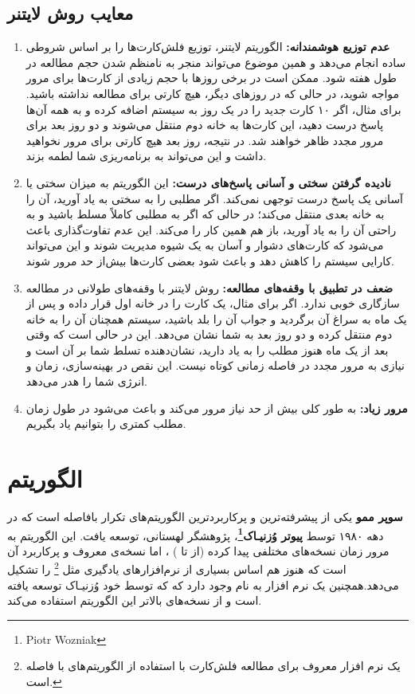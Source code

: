 \documentclass[12pt]{report}
\begin{document}
\section{معایب روش لایتنر}
\begin{enumerate}
    \item \textbf{عدم توزیع هوشمندانه:} الگوریتم لایتنر، توزیع فلش‌کارت‌ها را بر اساس شروطی ساده انجام می‌دهد و همین موضوع می‌تواند منجر به نامنظم شدن حجم مطالعه در طول هفته شود. ممکن است در برخی روزها با حجم زیادی از کارت‌ها برای مرور مواجه شوید، در حالی که در روزهای دیگر، هیچ کارتی برای مطالعه نداشته باشید. برای مثال، اگر ۱۰ کارت جدید را در یک روز به سیستم اضافه کرده و به همه آن‌ها پاسخ درست دهید، این کارت‌ها به خانه دوم منتقل می‌شوند و دو روز بعد برای مرور مجدد ظاهر خواهند شد. در نتیجه، روز بعد هیچ کارتی برای مرور نخواهید داشت و این می‌تواند به برنامه‌ریزی شما لطمه بزند.
    \item \textbf{نادیده گرفتن سختی و آسانی پاسخ‌های درست:} این الگوریتم به میزان سختی یا آسانی یک پاسخ درست توجهی نمی‌کند. اگر مطلبی را به سختی به یاد آورید، آن را به خانه بعدی منتقل می‌کند؛ در حالی که اگر به مطلبی کاملاً مسلط باشید و به راحتی آن را به یاد آورید، باز هم همین کار را می‌کند. این عدم تفاوت‌گذاری باعث می‌شود که کارت‌های دشوار و آسان به یک شیوه مدیریت شوند و این می‌تواند کارایی سیستم را کاهش دهد و باعث شود بعضی کارت‌ها بیش‌از حد مرور شوند.
    \item \textbf{ضعف در تطبیق با وقفه‌های مطالعه:} روش لایتنر با وقفه‌های طولانی در مطالعه سازگاری خوبی ندارد. اگر برای مثال، یک کارت را در خانه اول قرار داده و پس از یک ماه به سراغ آن برگردید و جواب آن را بلد باشید، سیستم همچنان آن را به خانه دوم منتقل کرده و دو روز بعد به شما نشان می‌دهد. این در حالی است که وقتی بعد از یک ماه هنوز مطلب را به یاد دارید، نشان‌دهنده تسلط شما بر آن است و نیازی به مرور مجدد در فاصله زمانی کوتاه نیست. این نقص در بهینه‌سازی، زمان و انرژی شما را هدر می‌دهد.
    \item \textbf{مرور زیاد:} به طور کلی بیش از حد نیاز مرور می‌کند و باعث می‌شود در طول زمان مطلب کمتری را بتوانیم یاد بگیریم.
\end{enumerate}

\chapter{الگوریتم }

\textbf{سوپر ممو} 
یکی از پیشرفته‌ترین و پرکاربردترین الگوریتم‌های تکرار بافاصله است که در دهه ۱۹۸۰ توسط 
\textbf{پیوتر وُزنیـاک\footnote{Piotr Wozniak}}، پژوهشگر لهستانی، توسعه یافت. این الگوریتم به مرور زمان نسخه‌های مختلفی پیدا کرده (از  تا )
، اما نسخه‌ی معروف و پرکاربرد آن \textbf{} است که هنوز هم اساس بسیاری از نرم‌افزارهای یادگیری 
مثل 
\footnote{ یک نرم افزار معروف برای مطالعه فلش‌کارت با استفاده از الگوریتم‌های با فاصله است.}
را تشکیل می‌دهد.همچنین یک نرم افزار به نام 
 وجود دارد که 
که توسط خود وُزنیـاک توسعه یافته است
و از نسخه‌های بالاتر این الگوریتم استفاده می‌کند.
\end{document}
